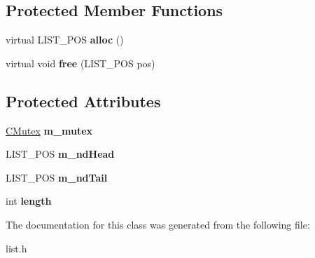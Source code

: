 \subsection*{Protected Member Functions}
\begin{DoxyCompactItemize}
\item 
\hypertarget{class_c_list_acdb91815d21dabe0572e67da9bfd4c27}{virtual L\-I\-S\-T\-\_\-\-P\-O\-S {\bfseries alloc} ()}\label{class_c_list_acdb91815d21dabe0572e67da9bfd4c27}

\item 
\hypertarget{class_c_list_aff212aceabad23dbb4370273ac91d814}{virtual void {\bfseries free} (L\-I\-S\-T\-\_\-\-P\-O\-S pos)}\label{class_c_list_aff212aceabad23dbb4370273ac91d814}

\end{DoxyCompactItemize}
\subsection*{Protected Attributes}
\begin{DoxyCompactItemize}
\item 
\hypertarget{class_c_list_a76347b2a51428a724cc7698074e08639}{\hyperlink{class_c_mutex}{C\-Mutex} {\bfseries m\-\_\-mutex}}\label{class_c_list_a76347b2a51428a724cc7698074e08639}

\item 
\hypertarget{class_c_list_a3ffa4c25b7b0604451366791aede5af7}{L\-I\-S\-T\-\_\-\-P\-O\-S {\bfseries m\-\_\-nd\-Head}}\label{class_c_list_a3ffa4c25b7b0604451366791aede5af7}

\item 
\hypertarget{class_c_list_aeeb0d3cb327800216a8f0fa112efa8d6}{L\-I\-S\-T\-\_\-\-P\-O\-S {\bfseries m\-\_\-nd\-Tail}}\label{class_c_list_aeeb0d3cb327800216a8f0fa112efa8d6}

\item 
\hypertarget{class_c_list_adb228ed98190b1f57080840440f2eb2b}{int {\bfseries length}}\label{class_c_list_adb228ed98190b1f57080840440f2eb2b}

\end{DoxyCompactItemize}


The documentation for this class was generated from the following file\-:\begin{DoxyCompactItemize}
\item 
list.\-h\end{DoxyCompactItemize}
